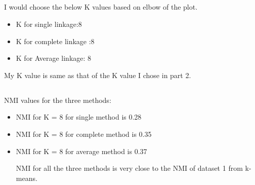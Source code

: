 \documentclass[11pt]{article}
\begin{document}
       \subsection{}   
       
       I would choose the below K values based on elbow of the plot.
       \begin{itemize}
       \item K for single linkage:8
       \item K for complete linkage :8
       \item K for Average linkage: 8
        \end{itemize}
       My K value is same as that of the K value I chose in part 2.\\
 \subsection{}
       NMI values for the three methods:\\
       \begin{itemize}
\item NMI for K = 8 for single method is 0.28
\item NMI for K = 8 for complete method is 0.35
\item NMI for K = 8 for average method is 0.37

NMI for all the three methods is very close to the NMI of dataset 1 from k-means.
	  \end{itemize}


    
    
    
    
\end{document}
